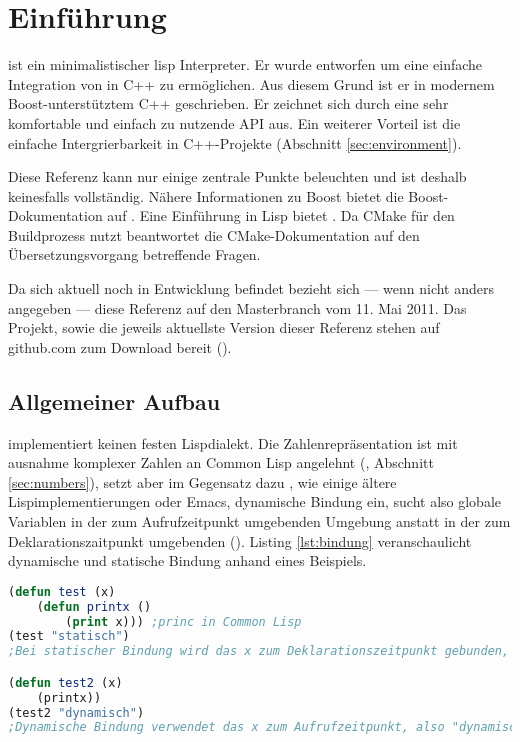 \section{Einführung}
\label{sec:einfuehrung}

\projectname{} ist ein minimalistischer lisp Interpreter. Er wurde entworfen um eine einfache
Integration von in C++ zu ermöglichen. Aus diesem Grund ist er in modernem Boost-unterstütztem
C++ geschrieben. Er zeichnet sich durch eine sehr komfortable und einfach zu nutzende API aus.
Ein weiterer Vorteil ist die einfache Intergrierbarkeit in C++-Projekte (Abschnitt \ref{sec:environment}).

Diese Referenz kann nur einige zentrale Punkte beleuchten und ist deshalb keinesfalls vollständig. Nähere Informationen zu Boost bietet die Boost-Do\-ku\-men\-ta\-tion auf \cite{smart_ptr_online}. Eine Einführung in Lisp bietet \cite{graham_ansi_1995}. Da \projectname{} CMake für den Buildprozess nutzt beantwortet die CMake-Dokumentation auf \cite{cmake_online} den Übersetzungsvorgang betreffende Fragen.

Da sich \projectname{} aktuell noch in Entwicklung befindet bezieht sich --- wenn nicht anders angegeben --- diese Referenz auf den Masterbranch vom 11. Mai 2011.
Das Projekt, sowie die jeweils aktuellste Version dieser Referenz stehen auf github.com zum Download bereit (\cite{lisp_interaction_online}\cite{lisp_interaction_ref_online}). %

\subsection{Allgemeiner Aufbau}


\projectname{} implementiert keinen festen Lispdialekt. Die Zahlenrepräsentation ist mit ausnahme komplexer Zahlen an Common Lisp angelehnt (\cite[S. 143ff]{graham_ansi_1995}, Abschnitt \ref{sec:numbers}), setzt aber im Gegensatz dazu , wie einige ältere Lispimplementierungen oder Emacs, dynamische Bindung ein, sucht also globale Variablen in der zum Aufrufzeitpunkt umgebenden Umgebung anstatt in der zum Deklarationszaitpunkt umgebenden (\cite[36, 63]{wilhelm_uebersetzerbau_2007}\cite[112]{graham_ansi_1995}). Listing \ref{lst:bindung} veranschaulicht dynamische und statische Bindung anhand eines Beispiels.

\begin{lstlisting}[caption={dynamische Bindung}, label=lst:bindung, language=Lisp]
(defun test (x)
    (defun printx ()
        (print x))) ;princ in Common Lisp
(test "statisch")
;Bei statischer Bindung wird das x zum Deklarationszeitpunkt gebunden, also "statisch"

(defun test2 (x)
    (printx))
(test2 "dynamisch")
;Dynamische Bindung verwendet das x zum Aufrufzeitpunkt, also "dynamisch"
\end{lstlisting}

